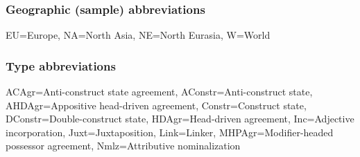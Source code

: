 \subsubsection{Geographic (sample) abbreviations}
\begin{flushleft}
EU=Europe, NA=North Asia, NE=North Eurasia, W=World
\end{flushleft}

\subsubsection{Type abbreviations}
\begin{flushleft}
ACAgr=Anti-construct state agreement, AConstr=Anti-construct state, AHDAgr=Appositive head-driven agreement, Constr=Construct state, DConstr=Double-construct state, HDAgr=Head-driven agreement, Inc=Adjective incorporation, Juxt=Juxtaposition, Link=Linker, MHPAgr=Modifier-headed possessor agreement, Nmlz=Attributive nominalization
\end{flushleft}

